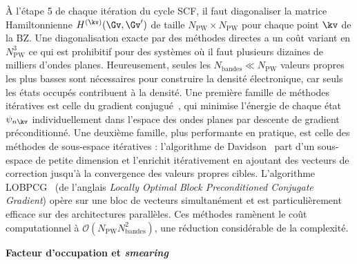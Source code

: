 À l'étape 5 de chaque itération du cycle SCF, il faut diagonaliser la matrice Hamiltonnienne $H^{(\kv)}(\Gv,\Gv')$ de taille $N_\text{PW}\times N_\text{PW}$ pour chaque point $\kv$ de la BZ. Une diagonalisation exacte par des méthodes directes a un coût variant en $N_\text{PW}^3$ ce qui est prohibitif pour des systèmes où il faut plusieurs dizaines de milliers d'ondes planes. Heureusement, seules les $N_\text{bandes}\ll N_\text{PW}$ valeurs propres les plus basses sont nécessaires pour construire la densité électronique, car seuls les états occupés contribuent à la densité. Une première famille de méthodes itératives est celle du gradient conjugué~\cite{hestenesMethodsConjugateGradients}, qui minimise l'énergie de chaque état $\psi_{n\kv}$ individuellement dans l'espace des ondes planes par descente de gradient préconditionné. Une deuxième famille, plus performante en pratique, est celle des méthodes de sous-espace itératives : l'algorithme de Davidson~\cite{davidsonIterativeCalculationFew1975} part d'un sous-espace de petite dimension et l'enrichit itérativement en ajoutant des vecteurs de correction jusqu'à la convergence des valeurs propres cibles. L'algorithme LOBPCG~\cite{OptimalPreconditionedEigensolver} (de l'anglais \textit{Locally Optimal Block Preconditioned Conjugate Gradient}) opère sur une bloc de vecteurs simultanément et est particulièrement efficace sur des architectures parallèles. Ces méthodes ramènent le coût computationnel à $\mathcal{O}(N_\text{PW} N_\text{bandes}^2)$, une réduction considérable de la complexité. 

\noindent\textbf{Facteur d'occupation et \textit{smearing}}

